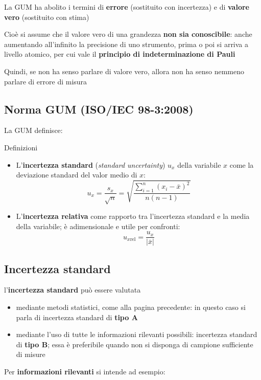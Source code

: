 \documentclass[
  letterpaper,
  DIV=11,
  numbers=noendperiod,
  oneside]{scrartcl}
\providecommand{\tightlist}{%
  \setlength{\itemsep}{0pt}\setlength{\parskip}{0pt}}
\begin{document}
La GUM ha abolito i termini di \textbf{errore} (sostituito con
{incertezza}) e di \textbf{valore vero} (sostituito con {stima})

Cioè si assume che il valore vero di una grandezza \textbf{non sia
conoscibile}: anche aumentando all'infinito la precisione di uno
strumento, prima o poi si arriva a livello atomico, per cui vale il
\textbf{principio di indeterminazione di Pauli}

Quindi, se non ha senso parlare di valore vero, allora non ha senso
nemmeno parlare di errore di misura

\subsection{Norma GUM (ISO/IEC
98-3:2008)}\label{norma-gum-isoiec-98-32008-1}

La GUM definisce:

Definizioni

\begin{itemize}
\tightlist
\item
  L'\textbf{incertezza standard} (\emph{standard uncertainty}) \(u_x\)
  della variabile \(x\) come la deviazione standard del valor medio di
  \(x\): \[
  u_x=\frac{s_x}{\sqrt{n}}=\sqrt{\frac{\sum_{i=1}^n(x_i-\bar x)^2}{n(n-1)}}
  \]
\item
  L'\textbf{incertezza relativa} come rapporto tra l'incertezza standard
  e la media della variabile; è adimensionale e utile per confronti: \[
  u_{x\mathrm{rel}}=\frac{u_x}{|\bar x|}
  \]
\end{itemize}

\subsection{Incertezza standard}\label{incertezza-standard}

l'\textbf{incertezza standard} può essere valutata

\begin{itemize}
\tightlist
\item
  mediante metodi statistici, come alla pagina precedente: in questo
  caso si parla di incertezza standard di \textbf{tipo A}
\item
  mediante l'uso di tutte le informazioni rilevanti possibili:
  incertezza standard di \textbf{tipo B}; essa è preferibile quando non
  si disponga di campione sufficiente di misure
\end{itemize}

Per \textbf{informazioni rilevanti} si intende ad esempio:
\end{document}
